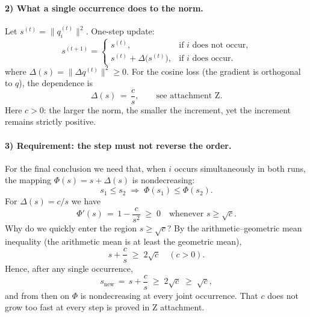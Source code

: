 \paragraph{2) What a single occurrence does to the norm.}
Let $s^{(t)} = \bigl\|q_i^{(t)}\bigr\|^2$. One-step update:
\begin{equation}
s^{(t+1)} = \begin{cases}
s^{(t)}, & \text{if $i$ does not occur,} \\
s^{(t)} + \Delta\bigl(s^{(t)}\bigr), & \text{if $i$ does occur.}
\end{cases}
\end{equation}
where $\Delta(s) = \bigl\|\Delta q^{(t)}\bigr\|^2 \ge 0$. For the cosine loss (the gradient is orthogonal to $q$), the dependence is
\begin{equation}
\Delta(s) \,=\, \frac{c}{s}, \qquad \text{see attachment Z}.
\end{equation}
Here $c > 0$: the larger the norm, the smaller the increment, yet the increment remains strictly positive.

\paragraph{3) Requirement: the step must not reverse the order.}
For the final conclusion we need that, when $i$ occurs simultaneously in both runs, the mapping $\Phi(s) = s + \Delta(s)$ is nondecreasing:
\begin{equation}
s_1 \le s_2 \;\Rightarrow\; \Phi(s_1) \le \Phi(s_2).
\end{equation}
For $\Delta(s) = c/s$ we have
\begin{equation}
\Phi'(s) \,=\, 1 - \frac{c}{s^2} \;\ge\; 0 \quad \text{whenever } s \ge \sqrt{c}.
\end{equation}
Why do we quickly enter the region $s \ge \sqrt{c}$? By the arithmetic–geometric mean inequality (the arithmetic mean is at least the geometric mean),
\begin{equation}
s + \frac{c}{s} \;\ge\; 2\sqrt{c} \quad (c>0).
\end{equation}
Hence, after any single occurrence,
\begin{equation}
s_{\mathrm{new}} \,=\, s + \frac{c}{s} \;\ge\; 2\sqrt{c} \;\ge\; \sqrt{c},
\end{equation}
and from then on $\Phi$ is nondecreasing at every joint occurrence. That $c$ does not grow too fast at every step is proved in Z attachment.

